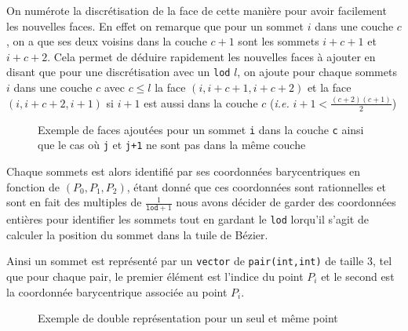 \documentclass{article}
\begin{document}
On numérote la discrétisation de la face de cette manière pour avoir facilement les nouvelles faces. En effet on remarque que pour un sommet $i$ dans une couche $c$, on a que ses deux voisins dans la couche $c+1$ sont les sommets $i+c+1$ et $i+c+2$. Cela permet de déduire rapidement les nouvelles faces à ajouter en disant que pour une discrétisation avec un \texttt{lod} $l$, on ajoute pour chaque sommets $i$ dans une couche $c$ avec $c\leq l$ la face $(i,i+c+1,i+c+2)$ et la face $(i,i+c+2,i+1)$ si $i+1$ est aussi dans la couche $c$ (\textit{i.e.} $i+1< \frac{(c+2)(c+1)}{2}$)
\begin{figure}[H]
\centering
{}
\caption{Exemple de faces ajoutées pour un sommet \texttt{i} dans la couche \texttt{c} ainsi que le cas où \texttt{j} et \texttt{j+1} ne sont pas dans la même couche}
\end{figure}

Chaque sommets est alors identifié par ses coordonnées barycentriques en fonction de $(P_{0},P_{1},P_{2})$, étant donné que ces coordonnées sont rationnelles et sont en fait des multiples de $\frac{1}{\texttt{lod}+1}$ nous avons décider de garder des coordonnées entières pour identifier les sommets tout en gardant le \texttt{lod} lorqu'il s'agit de calculer la position du sommet dans la tuile de Bézier.

Ainsi un sommet est représenté par un \texttt{vector} de \texttt{pair(int,int)} de taille 3, tel que pour chaque pair, le premier élément est l'indice du point $P_{i}$ et le second est la coordonnée barycentrique associée au point $P_{i}$.
\begin{figure}[H]
\centering
{}
\caption{Exemple de double représentation pour un seul et même point}
\label{fig:doublerepr}
\end{figure}
\end{document}
